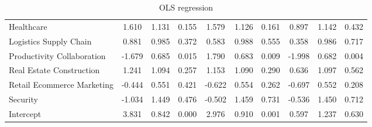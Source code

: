 \documentclass[12pt]{article}
\begin{document}
\begin{table} [ht]
\begin{tabular}{lccccccccc}
      Healthcare & 1.610 & 1.131 & 0.155 & 1.579 & 1.126 & 0.161 & 0.897 & 1.142 & 0.432 \\
      Logistics Supply Chain & 0.881 & 0.985 & 0.372 & 0.583 & 0.988 & 0.555 & 0.358 & 0.986 & 0.717 \\
      Productivity Collaboration & -1.679 & 0.685 & 0.015 & 1.790 & 0.683 & 0.009 & -1.998 & 0.682 & 0.004 \\
      Real Estate Construction & 1.241 & 1.094 & 0.257 & 1.153 & 1.090 & 0.290 & 0.636 & 1.097 & 0.562 \\
      Retail Ecommerce Marketing & -0.444 & 0.551 & 0.421 & -0.622 & 0.554 & 0.262 & -0.697 & 0.552 & 0.208 \\
      Security & -1.034 & 1.449 & 0.476 & -0.502 & 1.459 & 0.731 & -0.536 & 1.450 & 0.712 \\
      Intercept & 3.831 & 0.842 & 0.000 & 2.976 & 0.910 & 0.001 & 0.597 & 1.237 & 0.630 \\
  \end{tabular}
\caption{OLS regression}
\label{table6}

\end{table}
\end{document}
